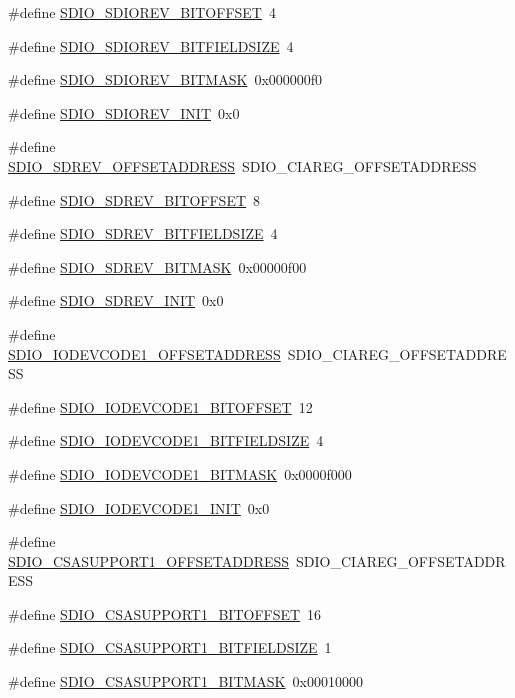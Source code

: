 \begin{DoxyCompactItemize}
\item 
\#define \hyperlink{a00571_a802e3d04dae2faa70daade1d3ccf4418}{SDIO\_\-SDIOREV\_\-BITOFFSET}~4
\item 
\#define \hyperlink{a00571_a11219b982b00cc922408a71110b78db6}{SDIO\_\-SDIOREV\_\-BITFIELDSIZE}~4
\item 
\#define \hyperlink{a00571_ac517380f2d1ed3e3d0822f6bf10dfd34}{SDIO\_\-SDIOREV\_\-BITMASK}~0x000000f0
\item 
\#define \hyperlink{a00571_a8c51dddbd1b35a98185a20f45a3db338}{SDIO\_\-SDIOREV\_\-INIT}~0x0
\item 
\#define \hyperlink{a00571_a4b6de30a2a11820996c90d958c69d182}{SDIO\_\-SDREV\_\-OFFSETADDRESS}~SDIO\_\-CIAREG\_\-OFFSETADDRESS
\item 
\#define \hyperlink{a00571_abd4b9eccfbf2043e2138a04b212982a1}{SDIO\_\-SDREV\_\-BITOFFSET}~8
\item 
\#define \hyperlink{a00571_a276e42f08fcf2eb14218bd285c7ebc32}{SDIO\_\-SDREV\_\-BITFIELDSIZE}~4
\item 
\#define \hyperlink{a00571_a29ee33e2e2a4171fecdc4e2bdce07de5}{SDIO\_\-SDREV\_\-BITMASK}~0x00000f00
\item 
\#define \hyperlink{a00571_aea27d3bce850ba3f85b5ad3ec4fbf8a7}{SDIO\_\-SDREV\_\-INIT}~0x0
\item 
\#define \hyperlink{a00571_ad8188ea6d5eb3faf2a811f5237dff8f9}{SDIO\_\-IODEVCODE1\_\-OFFSETADDRESS}~SDIO\_\-CIAREG\_\-OFFSETADDRESS
\item 
\#define \hyperlink{a00571_a9c2eefd71718f322f0743ae43450b764}{SDIO\_\-IODEVCODE1\_\-BITOFFSET}~12
\item 
\#define \hyperlink{a00571_a912fae07eb3f494bc6fa9ecba55c6705}{SDIO\_\-IODEVCODE1\_\-BITFIELDSIZE}~4
\item 
\#define \hyperlink{a00571_a0310b2ca6c85ec98b343278b7f093646}{SDIO\_\-IODEVCODE1\_\-BITMASK}~0x0000f000
\item 
\#define \hyperlink{a00571_a99e78e386ce9eda01437bc8c7ee776b0}{SDIO\_\-IODEVCODE1\_\-INIT}~0x0
\item 
\#define \hyperlink{a00571_aa987527a6787c343e082b885a2ae850d}{SDIO\_\-CSASUPPORT1\_\-OFFSETADDRESS}~SDIO\_\-CIAREG\_\-OFFSETADDRESS
\item 
\#define \hyperlink{a00571_aba1ac9376328e840aaf9811119be7668}{SDIO\_\-CSASUPPORT1\_\-BITOFFSET}~16
\item 
\#define \hyperlink{a00571_ab28565078d296785cfc04fccd5b1100c}{SDIO\_\-CSASUPPORT1\_\-BITFIELDSIZE}~1
\item 
\#define \hyperlink{a00571_a07e5eca7d91c81110c1aa242d484854d}{SDIO\_\-CSASUPPORT1\_\-BITMASK}~0x00010000

\end{DoxyCompactItemize}
